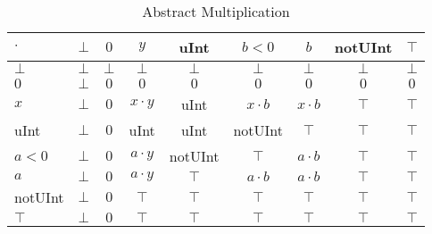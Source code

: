 \begin{table}[htbp]
\centering
\begin{tabular}{l|cccccccc}
$\cdot$ & $\bot$ & $0$    & $y$         & uInt    & $b < 0$     & $b$         & notUInt & $\top$ \\\hline
$\bot$  & $\bot$ & $\bot$ & $\bot$      & $\bot$  & $\bot$      & $\bot$      & $\bot$  & $\bot$ \\
$0$     & $\bot$ & $0$    & $0$         & $0$     & $0$         & $0$         & $0$     & $0$    \\
$x$     & $\bot$ & $0$    & $x\cdot y$  & uInt    & $x\cdot b$  & $x\cdot b$  & $\top$  & $\top$ \\
uInt    & $\bot$ & $0$    & uInt        & uInt    & notUInt     & $\top$      & $\top$  & $\top$ \\
$a < 0$ & $\bot$ & $0$    & $a\cdot y$  & notUInt & $\top$      & $a\cdot b$  & $\top$  & $\top$ \\
$a$     & $\bot$ & $0$    & $a \cdot y$ & $\top$  & $a \cdot b$ & $a \cdot b$ & $\top$  & $\top$ \\
notUInt & $\bot$ & $0$    & $\top$      & $\top$  & $\top$      & $\top$      & $\top$  & $\top$ \\
$\top$  & $\bot$ & $0$    & $\top$      & $\top$  & $\top$      & $\top$      & $\top$  & $\top$
\end{tabular}
\caption{Abstract Multiplication}
\label{tab:abstract_multiplication}
\end{table}

